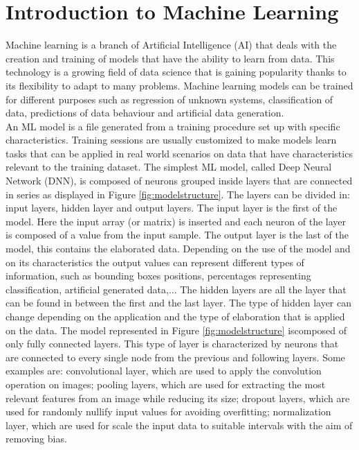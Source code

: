 \documentclass[12pt]{report}
\begin{document}
\section{Introduction to Machine Learning}
Machine learning is a branch of Artificial Intelligence (AI) that deals with the creation and training of models that have the ability to learn from data. This technology is a growing field of data science that is gaining popularity thanks to its flexibility to adapt to many problems. Machine learning models can be trained for different purposes such as regression of unknown systems, classification of data, predictions of data behaviour and artificial data generation.\\
An ML model is a file generated from a training procedure set up with specific characteristics. Training sessions are usually customized to make models learn tasks that can be applied in real world scenarios on data that have characteristics relevant to the training dataset. The simplest ML model, called Deep Neural Network (DNN), is composed of neurons grouped inside layers that are connected in series as displayed in Figure \ref{fig:modelstructure}. The layers can be divided in: input layers, hidden layer and output layers. 
The input layer is the first of the model. Here the input array (or matrix) is inserted and each neuron of the layer is composed of a value from the input sample. 
The output layer is the last of the model, this contains the elaborated data. Depending on the use of the model and on its characteristics the output values can represent different types of information, such as bounding boxes positions, percentages representing classification, artificial generated data,... 
The hidden layers are all the layer that can be found in between the first and the last layer. The type of hidden layer can change depending on the application and the type of elaboration that is applied on the data. The model represented in  Figure \ref{fig:modelstructure} iscomposed of only fully connected layers. This type of layer is characterized by neurons that are connected to every single node from the previous and following layers. Some examples are: convolutional layer, which are used to apply the convolution operation on images; pooling layers, which are used for extracting the most relevant features from an image while reducing its size; dropout layers, which are used for randomly nullify input values for avoiding overfitting; normalization layer, which are used for scale the input data to suitable intervals with the aim of removing bias. \\
\end{document}
